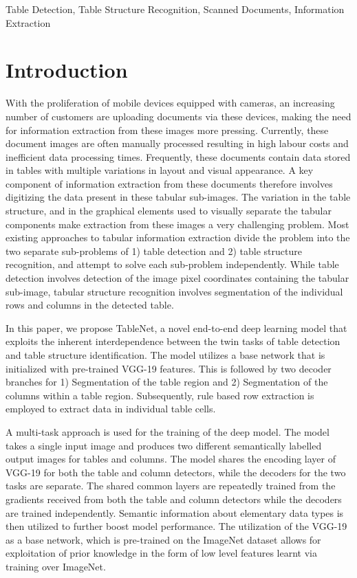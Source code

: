\documentclass[conference]{IEEEtran}
\begin{document}
\begin{IEEEkeywords}
Table Detection, Table Structure Recognition, Scanned Documents, Information Extraction
\end{IEEEkeywords}

\section{Introduction}
With the proliferation of mobile devices equipped with cameras, an increasing number of customers are uploading documents via these devices, making the need for information extraction from these images more pressing. Currently, these document images are often manually processed resulting in high labour costs and inefficient data processing times. Frequently, these documents contain data stored in tables with multiple variations in layout and visual appearance. A key component of information extraction from these documents therefore involves digitizing the data present in these tabular sub-images. The variation in the table structure, and in the graphical elements  used to visually separate the tabular components make extraction from these images a very challenging problem. Most existing approaches to tabular information extraction  divide the problem into the two separate sub-problems of 1) table detection and 2) table structure recognition, and attempt to solve each sub-problem independently. While table detection involves detection of the image pixel coordinates containing the tabular sub-image, tabular structure recognition involves segmentation of the individual rows and columns in the detected table.  

In this paper, we propose TableNet, a novel end-to-end deep learning model that exploits the inherent interdependence between the twin tasks of table detection and table structure identification. The model utilizes a base network that is initialized with pre-trained VGG-19 features. This is followed by two decoder branches for 1) Segmentation of the table region and 2) Segmentation of the columns within a table region. Subsequently, rule based row extraction is employed to extract data in individual table cells. 

A multi-task approach is used for the training of the deep model. The model takes a single input image and produces two different semantically labelled output images for tables and columns. The model shares the encoding layer of VGG-19 for both the table and column detectors, while the decoders for the two tasks are separate. The shared common layers are repeatedly trained from the gradients received from both the table and column detectors while the decoders are trained independently. Semantic information about elementary data types is then utilized to further boost model performance. The utilization of the VGG-19 as a base network, which is pre-trained on the ImageNet dataset allows for exploitation of prior knowledge in the form of low level features learnt via training over ImageNet. 
\end{document}

